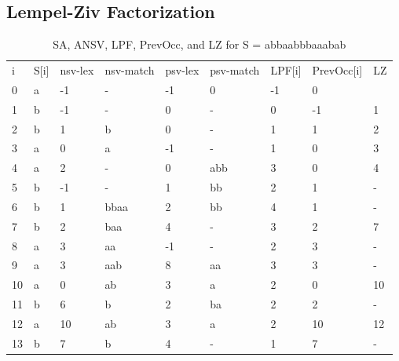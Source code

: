 \subsection{Lempel-Ziv Factorization}

\begin{table}[ht!]
\centering
\begin{tabular}{lllllllll}
i  & S{[}i{]} & nsv-lex & nsv-match & psv-lex & psv-match & LPF{[}i{]} & PrevOcc{[}i{]} & LZ \\
0  & a        & -1      & -         & -1      & 0         & -1         & 0              &    \\
1  & b        & -1      & -         & 0       & -         & 0          & -1             & 1  \\
2  & b        & 1       & b         & 0       & -         & 1          & 1              & 2  \\
3  & a        & 0       & a         & -1      & -         & 1          & 0              & 3  \\
4  & a        & 2       & -         & 0       & abb       & 3          & 0              & 4  \\
5  & b        & -1      & -         & 1       & bb        & 2          & 1              & -  \\
6  & b        & 1       & bbaa      & 2       & bb        & 4          & 1              & -  \\
7  & b        & 2       & baa       & 4       & -         & 3          & 2              & 7  \\
8  & a        & 3       & aa        & -1      & -         & 2          & 3              & -  \\
9  & a        & 3       & aab       & 8       & aa        & 3          & 3              & -  \\
10 & a        & 0       & ab        & 3       & a         & 2          & 0              & 10 \\
11 & b        & 6       & b         & 2       & ba        & 2          & 2              & -  \\
12 & a        & 10      & ab        & 3       & a         & 2          & 10             & 12 \\
13 & b        & 7       & b         & 4       & -         & 1          & 7              & - 
\end{tabular}
\caption{SA, ANSV, LPF, PrevOcc, and LZ for S = abbaabbbaaabab}
\label{table:allsolved}
\end{table}

